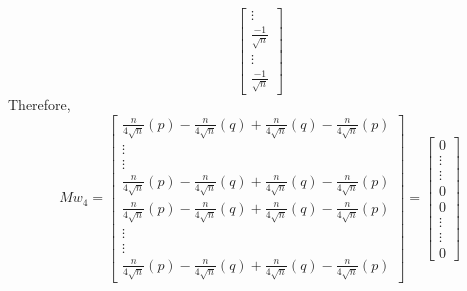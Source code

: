 \documentclass[10pt]{article}
\begin{document}
\begin{flushleft}
$$\begin{bmatrix}
\vdots\\
\frac{-1}{\sqrt n}\\
\vdots\\
\frac{-1}{\sqrt n}
\end{bmatrix}
$$
Therefore, \\
$$ Mw_{4} = 
\begin{bmatrix}
\frac{n}{4 \sqrt n} (p) - \frac{n}{4 \sqrt n} (q) + \frac{n}{4 \sqrt n} (q) - \frac{n}{4 \sqrt n} (p)\\
\vdots\\
\vdots\\
\frac{n}{4 \sqrt n} (p) - \frac{n}{4 \sqrt n} (q) + \frac{n}{4 \sqrt n} (q) - \frac{n}{4 \sqrt n} (p)\\
\frac{n}{4 \sqrt n} (p) - \frac{n}{4 \sqrt n} (q) + \frac{n}{4 \sqrt n} (q) - \frac{n}{4 \sqrt n} (p)\\
\vdots\\
\vdots\\
\frac{n}{4 \sqrt n} (p) - \frac{n}{4 \sqrt n} (q) + \frac{n}{4 \sqrt n} (q) - \frac{n}{4 \sqrt n} (p)
\end{bmatrix}
= \begin{bmatrix}
0\\
\vdots\\
\vdots\\
0\\
0\\
\vdots\\
\vdots\\
0
\end{bmatrix}
$$
\end{flushleft}
\end{document}
